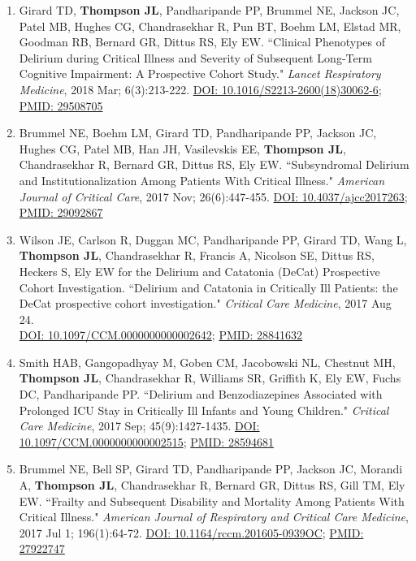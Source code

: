 \documentclass[5pt]{article}
\begin{document}
\begin{enumerate}
\item Girard TD, \textbf{Thompson JL}, Pandharipande PP, Brummel NE, Jackson JC, Patel MB, Hughes CG, Chandrasekhar R, Pun BT, Boehm LM, Elstad MR, Goodman RB, Bernard GR, Dittus RS, Ely EW. ``Clinical Phenotypes of Delirium during Critical Illness and Severity of Subsequent Long-Term Cognitive Impairment: A Prospective Cohort Study." \emph{Lancet Respiratory Medicine}, 2018 Mar; 6(3):213-222. \href{https://doi.org/10.1016/S2213-2600(18)30062-6}{DOI: 10.1016/S2213-2600(18)30062-6}; \href{https://www.ncbi.nlm.nih.gov/pubmed/29508705}{PMID: 29508705}
\item Brummel NE, Boehm LM, Girard TD, Pandharipande PP, Jackson JC, Hughes CG, Patel MB, Han JH, Vasilevskis EE, \textbf{Thompson JL}, Chandrasekhar R, Bernard GR, Dittus RS, Ely EW. ``Subsyndromal Delirium and Institutionalization Among Patients With Critical Illness." \emph{American Journal of Critical Care}, 2017 Nov; 26(6):447-455. \href{https://doi.org/10.4037/ajcc2017263}{DOI: 10.4037/ajcc2017263}; \href{https://www.ncbi.nlm.nih.gov/pubmed/29092867}{PMID: 29092867}
\item Wilson JE, Carlson R, Duggan MC, Pandharipande PP, Girard TD, Wang L, \textbf{Thompson JL}, Chandrasekhar R, Francis A, Nicolson SE, Dittus RS, Heckers S, Ely EW for the Delirium and Catatonia (DeCat) Prospective Cohort Investigation. ``Delirium and Catatonia in Critically Ill Patients: the DeCat prospective cohort investigation." \emph{Critical Care Medicine}, 2017 Aug 24.\\ \href{https://doi.org/10.1097/CCM.0000000000002642}{DOI: 10.1097/CCM.0000000000002642}; \href{https://www.ncbi.nlm.nih.gov/pubmed/28841632}{PMID: 28841632}
\item Smith HAB, Gangopadhyay M, Goben CM, Jacobowski NL, Chestnut MH, \textbf{Thompson JL}, Chandrasekhar R, Williams SR, Griffith K, Ely EW, Fuchs DC, Pandharipande PP. ``Delirium and Benzodiazepines Associated with Prolonged ICU Stay in Critically Ill Infants and Young Children." \emph{Critical Care Medicine}, 2017 Sep; 45(9):1427-1435. \href{https://doi.org/10.1097/CCM.0000000000002515}{DOI: 10.1097/CCM.0000000000002515}; \href{https://www.ncbi.nlm.nih.gov/pubmed/28594681}{PMID: 28594681}
\item Brummel NE, Bell SP, Girard TD, Pandharipande PP, Jackson JC, Morandi A, \textbf{Thompson JL}, Chandrasekhar R, Bernard GR, Dittus RS, Gill TM, Ely EW. ``Frailty and Subsequent Disability and Mortality Among Patients With Critical Illness." \emph{American Journal of Respiratory and Critical Care Medicine}, 2017 Jul 1; 196(1):64-72. \href{https://doi.org/10.1164/rccm.201605-0939OC}{DOI: 10.1164/rccm.201605-0939OC}; \href{https://www.ncbi.nlm.nih.gov/pubmed/27922747}{PMID: 27922747}

\end{enumerate}
\end{document}
